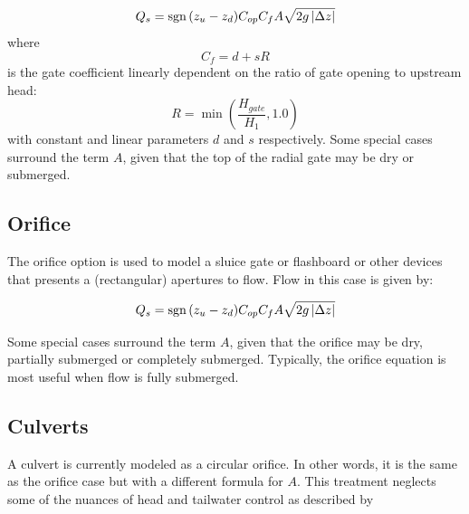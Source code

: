 $$
Q_s = \operatorname{sgn}{(z_{u} - z_{d})} C_{op} C_{f} A \sqrt{2g \left|\Delta z\right|}
$$
where
$$C_f = d + sR$$
is the gate coefficient linearly dependent on the ratio of gate opening to upstream head:
$$R = \min(\frac{H_{gate}}{H_1},1.0)$$
with constant and linear parameters $d$ and $s$ respectively.
Some special cases surround the term $A$, given that the top of the radial gate
may be dry or submerged.

\subsection{Orifice}
\label{sec-orifice}
The orifice option is used to model a sluice gate or flashboard or other devices that  
presents a (rectangular) apertures to flow. Flow in this case is given by:

$$
Q_{s} = \operatorname{sgn}{(z_{u} - z_{d})} C_{op} C_{f} A \sqrt{2g \left|\Delta z \right|}
$$

Some special cases surround the term $A$, given that the orifice may be dry, partially submerged or completely
submerged. Typically, the orifice equation is most useful when flow is fully submerged.

\subsection{Culverts}
A culvert is currently modeled as a circular orifice. In other words, it is the same as the orifice case
but with a different formula for $A$. This treatment neglects some of the nuances of head and tailwater control 
as described by \cite{Bodhaine68}
